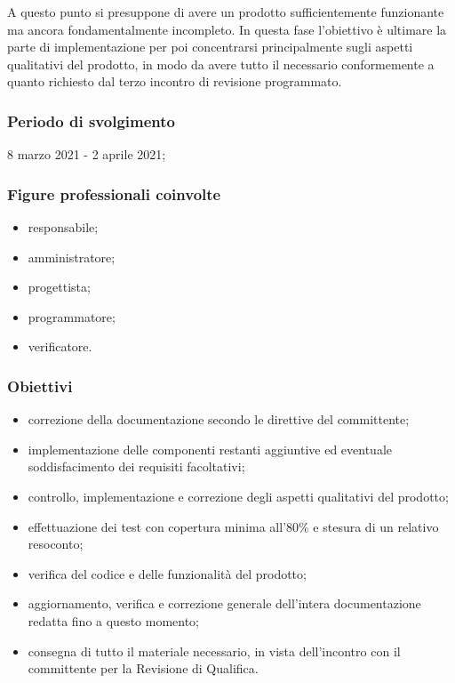 A questo punto si presuppone di avere un prodotto sufficientemente funzionante ma ancora fondamentalmente incompleto. In questa fase l'obiettivo è ultimare la parte di implementazione per poi concentrarsi principalmente sugli aspetti qualitativi del prodotto, in modo da avere tutto il necessario conformemente a quanto richiesto dal terzo incontro di revisione programmato.
        
        \subsubsection{Periodo di svolgimento}
        8 marzo 2021 - 2 aprile 2021;
        
        \subsubsection{Figure professionali coinvolte}
            \begin{itemize}
                \item responsabile;
                \item amministratore;
                \item progettista;
                \item programmatore;
                \item verificatore.
            \end{itemize}

        \subsubsection{Obiettivi}
        \begin{itemize}
            \item correzione della documentazione secondo le direttive del committente;
            \item implementazione delle componenti restanti aggiuntive ed eventuale soddisfacimento dei requisiti facoltativi;
            \item controllo, implementazione e correzione degli aspetti qualitativi del prodotto;
            \item effettuazione dei test con copertura minima all'80\% e stesura di un relativo resoconto;
            \item verifica del codice e delle funzionalità del prodotto;
            \item aggiornamento, verifica e correzione generale dell'intera documentazione redatta fino a questo momento;
            \item consegna di tutto il materiale necessario, in vista dell'incontro con il committente per la Revisione di Qualifica.
        \end{itemize}